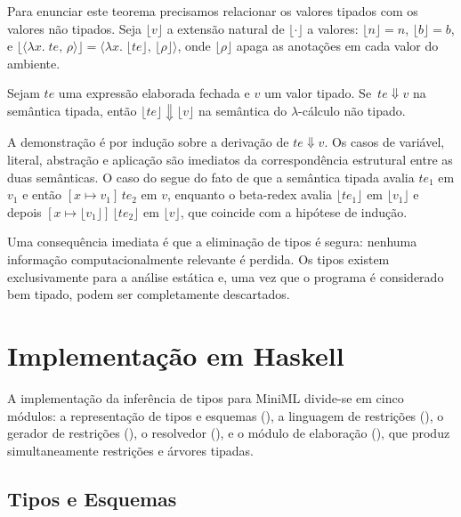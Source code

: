   Para enunciar este teorema precisamos relacionar os valores tipados com
  os valores não tipados. Seja \(\lfloor v \rfloor\) a extensão natural de
  \(\lfloor \cdot \rfloor\) a valores: \(\lfloor n \rfloor = n\),
  \(\lfloor b \rfloor = b\), e \(\lfloor \langle \lambda x.\; te,\, \rho
    \rangle \rfloor = \langle \lambda x.\; \lfloor te \rfloor,\, \lfloor
  \rho \rfloor \rangle\), onde \(\lfloor \rho \rfloor\) apaga as anotações
  em cada valor do ambiente.

  \begin{Theorem}
    Sejam \(te\) uma expressão elaborada fechada e \(v\) um valor tipado.
    Se \(\,te \Downarrow v\) na semântica tipada, então \(\lfloor te
    \rfloor \Downarrow \lfloor v \rfloor\) na semântica do $\lambda$-cálculo
    não tipado.
  \end{Theorem}

  A demonstração é por indução sobre a derivação de \(te \Downarrow v\). Os
  casos de variável, literal, abstração e aplicação são imediatos da
  correspondência estrutural entre as duas semânticas. O caso do
   segue do fato de que a semântica tipada avalia \(te_1\)
  em \(v_1\) e então \([x \mapsto v_1]\,te_2\) em \(v\), enquanto o
  beta-redex avalia \(\lfloor te_1 \rfloor\) em \(\lfloor v_1 \rfloor\) e
  depois \([x \mapsto \lfloor v_1 \rfloor]\,\lfloor te_2 \rfloor\) em
  \(\lfloor v \rfloor\), que coincide com a hipótese de indução.

  Uma consequência imediata é que a eliminação de tipos é segura: nenhuma
  informação computacionalmente relevante é perdida. Os tipos existem
  exclusivamente para a análise estática e, uma vez que o programa é
  considerado bem tipado, podem ser completamente descartados.

  \section{Implementação em Haskell}

  A implementação da inferência de tipos para MiniML divide-se em cinco
  módulos: a representação de tipos e esquemas
  (), a linguagem de restrições
  (), o gerador de restrições
  (), o resolvedor
  (), e o módulo de elaboração
  (), que produz simultaneamente
  restrições e árvores tipadas.

  \subsection{Tipos e Esquemas}

